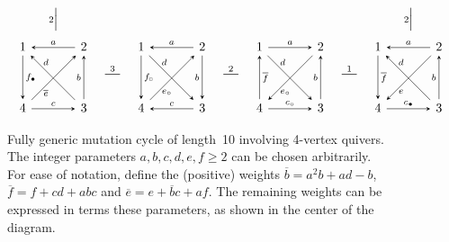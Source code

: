 \documentclass[11pt, letterpaper]{amsart}
\theoremstyle{definition}
\numberwithin{equation}{section}
\newcommand{\shortmutation}[1]{\stackrel{#1}{\rule[.5ex]{1.2em}{0.5pt}}}
\newcommand{\vmutation}[1]{  {\scriptstyle #1}{\Bigl|\Bigr.}  }
\def\ssquare{\scalebox{.75}{$\scriptscriptstyle\Box$}}
\begin{document}
\begin{figure}[ht]
\begin{equation*}
\begin{array}{ccccccccc}
 & \\ 
\\[-8pt]
\vmutation{2}   & & & & & & \vmutation{2} \\[-6pt]
\\
\begin{tikzcd}[arrows={-stealth}, sep=\sepps]
  1  \arrow[r,  "a", \snsl] \arrow[dr, "d" near start, outer sep=\outsepd, \snsl]  \arrow[d, "f_\bullet", \snls]  
  & 2  \arrow[d, swap, "b", \snsl] \arrow[dl, "\overline e", near end, outer sep=\outsepe, \snsl]
  \\
   4 
   & 3  \arrow[l, "c", swap, \snsl] 
\end{tikzcd}

& \shortmutation {3}
& 
\begin{tikzcd}[arrows={-stealth}, sep=\sepps]
  1  \arrow[r,  "a", \snsl] \arrow[dr, "d" near start, outer sep=\outsepd, \snls]  \arrow[d, "f_{\ssquare}", \snls]  
  & 2  \arrow[d, swap, "b", \snls] \arrow[dl, "e_\circ", near end, outer sep=\outsepe, \snsl]
  \\
   4 
   & 3  \arrow[l, "c", swap, \snls] 
\end{tikzcd}
& \shortmutation 2 
&  
\begin{tikzcd}[arrows={-stealth}, sep=\sepps]
  1  \arrow[r,  "a", \snls] \arrow[dr, "d" near start, outer sep=\outsepd, \snls]  \arrow[d, "\overline{f}", \snsl]  
  & 2  \arrow[d, swap, "b", \snsl] \arrow[dl, "e_\circ", near end, outer sep=\outsepe, \snls]
  \\
   4 
   & 3  \arrow[l, "c_\circ", swap, \snsl] 
\end{tikzcd} %
& \shortmutation 1
&  

\begin{tikzcd}[arrows={-stealth}, sep=\sepps]
  1  \arrow[r,  "a", \snsl] \arrow[dr, "d" near start, outer sep=\outsepd, \snsl]  \arrow[d, "\overline{f}", \snls]  
  & 2  \arrow[d, swap, "b", \snsl] \arrow[dl, "e", near end, outer sep=\outsepe, \snls]
  \\
   4 
   & 3  \arrow[l, "c_\bullet",  swap, \snsl] 
\end{tikzcd}

\end{array}
\hspace{-22pt}{\ }
\end{equation*}
\vspace{-.1in}
\caption{
Fully generic mutation cycle of length~10 involving 4-vertex quivers.  \linebreak[3]
The integer parameters $a,b,c,d,e,f \geq 2$ can be chosen arbitrarily. 
For ease of notation, define the (positive) weights $\overline{b}=a^2b + ad -b$, $\overline{f}=f+cd+abc$ and $\overline{e}=e+\overline{b}c + af$.
The remaining weights can be expressed in terms these parameters, 
as shown in the center of the diagram.
%
}
\label{fig:generic-10-cycle-allmutations}
\vspace{-.2in}
\end{figure}
\end{document}
